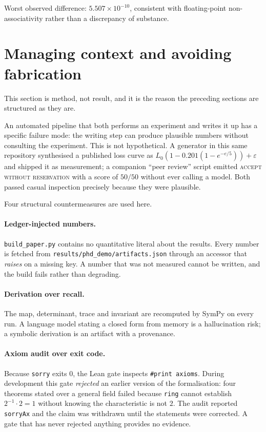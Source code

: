 \documentclass[11pt,a4paper]{article}
\begin{document}
Worst observed difference:
$5.507\times 10^{-10}$, consistent with
floating-point non-associativity rather than a discrepancy of substance.

\section{Managing context and avoiding fabrication}\label{sec:context}

This section is method, not result, and it is the reason the preceding sections
are structured as they are.

An automated pipeline that both performs an experiment and writes it up has a
specific failure mode: the writing step can produce plausible numbers without
consulting the experiment. This is not hypothetical. A generator in this same
repository synthesised a published loss curve as
$L_0\!\left(1-0.201(1-e^{-e/5})\right)+\varepsilon$ and shipped it as measurement;
a companion ``peer review'' script emitted \textsc{accept without reservation}
with a score of $50/50$ without ever calling a model. Both passed casual
inspection precisely because they were plausible.

Four structural countermeasures are used here.

\paragraph{Ledger-injected numbers.} \texttt{build\_paper.py} contains no
quantitative literal about the results. Every number is fetched from
\texttt{results/phd\_demo/artifacts.json} through an accessor that \emph{raises} on
a missing key. A number that was not measured cannot be written, and the build
fails rather than degrading.

\paragraph{Derivation over recall.} The map, determinant, trace and invariant are
recomputed by SymPy on every run. A language model stating a closed form from
memory is a hallucination risk; a symbolic derivation is an artifact with a
provenance.

\paragraph{Axiom audit over exit code.} Because \texttt{sorry} exits $0$, the Lean
gate inspects \texttt{\#print axioms}. During development this gate \emph{rejected}
an earlier version of the formalisation: four theorems stated over a general
field failed because \texttt{ring} cannot establish $2^{-1}\cdot 2=1$ without
knowing the characteristic is not $2$. The audit reported \texttt{sorryAx} and the
claim was withdrawn until the statements were corrected. A gate that has never
rejected anything provides no evidence.
\end{document}
